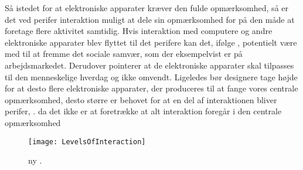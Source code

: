  Så istedet for at elektroniske apparater kræver den fulde opmærksomhed, så er det ved perifer interaktion muligt at dele sin opmærksomhed for på den måde at foretage flere aktivitet samtidig. Hvis interaktion med computere og andre elektroniske apparater blev flyttet til det perifere kan det, ifølge \textcite[s. 11]{PDF:TheComputerWeiser}, potentielt være med til at fremme det sociale samvær, som der eksempelvist er på arbejdsmarkedet. Derudover pointerer \textcite[s. 11]{PDF:TheComputerWeiser} at de elektroniske apparater skal tilpasses til den menneskelige hverdag og ikke omvendt. Ligeledes bør designere tage højde for at desto flere elektroniske apparater, der produceres til at fange vores centrale opmærksomhed, desto større er behovet for at en del af interaktionen bliver perifer, \parencite[s. 240]{PDF:PICharacteristicsAndConsiderations}. da det ikke er at foretrække at alt interaktion foregår i den centrale opmærksomhed


%
\begin{figure}[H]
	\centering
	\texttt{[image: LevelsOfInteraction]}
	\caption{ny \textcite[s. 118]{PDF:PeripheralInteraction}.}
	\label{fig:LevelsOfInteraction}
\end{figure}
\noindent
%

